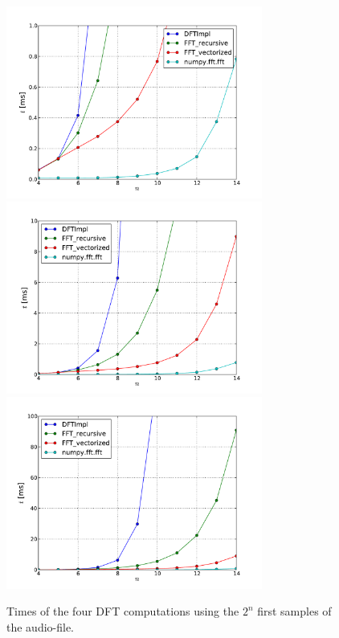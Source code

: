 \documentclass[a4paper, 11pt, notitlepage, english]{article}
\begin{document}
\begin{figure}[thb]
\centering
\includegraphics[width=0.75\textwidth]{times_a}
\includegraphics[width=0.75\textwidth]{times_b}
\includegraphics[width=0.75\textwidth]{times_c}
\caption{Times of the four DFT computations using the $2^n$ first samples of the audio-file.
\label{fig:contraction}}
\end{figure}

\clearpage
\end{document}
